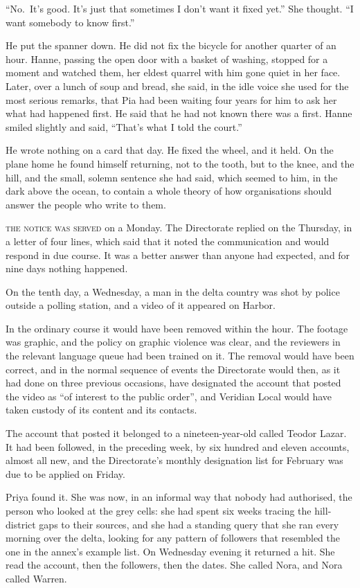 ``No.~It's good. It's just that sometimes I don't want it fixed yet.'' She thought. ``I want somebody to know first.''

He put the spanner down. He did not fix the bicycle for another quarter of an hour. Hanne, passing the open door with a basket of washing, stopped for a moment and watched them, her eldest quarrel with him gone quiet in her face. Later, over a lunch of soup and bread, she said, in the idle voice she used for the most serious remarks, that Pia had been waiting four years for him to ask her what had happened first. He said that he had not known there was a first. Hanne smiled slightly and said, ``That's what I told the court.''

He wrote nothing on a card that day. He fixed the wheel, and it held. On the plane home he found himself returning, not to the tooth, but to the knee, and the hill, and the small, solemn sentence she had said, which seemed to him, in the dark above the ocean, to contain a whole theory of how organisations should answer the people who write to them.


\textsc{the notice was served} on a Monday. The Directorate replied on the Thursday, in a letter of four lines, which said that it noted the communication and would respond in due course. It was a better answer than anyone had expected, and for nine days nothing happened.

On the tenth day, a Wednesday, a man in the delta country was shot by police outside a polling station, and a video of it appeared on Harbor.

In the ordinary course it would have been removed within the hour. The footage was graphic, and the policy on graphic violence was clear, and the reviewers in the relevant language queue had been trained on it. The removal would have been correct, and in the normal sequence of events the Directorate would then, as it had done on three previous occasions, have designated the account that posted the video as ``of interest to the public order'', and Veridian Local would have taken custody of its content and its contacts.

The account that posted it belonged to a nineteen-year-old called Teodor Lazar. It had been followed, in the preceding week, by six hundred and eleven accounts, almost all new, and the Directorate's monthly designation list for February was due to be applied on Friday.

Priya found it. She was now, in an informal way that nobody had authorised, the person who looked at the grey cells: she had spent six weeks tracing the hill-district gaps to their sources, and she had a standing query that she ran every morning over the delta, looking for any pattern of followers that resembled the one in the annex's example list. On Wednesday evening it returned a hit. She read the account, then the followers, then the dates. She called Nora, and Nora called Warren.


